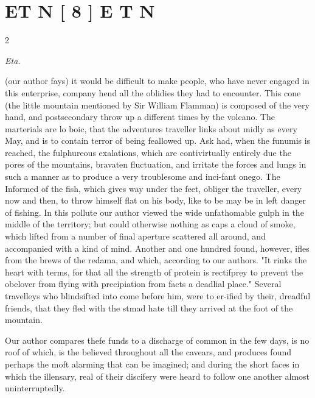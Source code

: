 \documentclass[10pt]{article}
\begin{document}
\section*{\centering ET N [ 8 ] E T N}
\begin{multicols}{2}\raggedcolumns
\begin{center}\small\itshape Eta.\end{center}
(our author fays) it would be difficult to make people, who have never engaged in this enterprise, company hend all the oblidies they had to encounter. This cone (the little mountain mentioned by Sir William Flamman) is composed of the very hand, and postsecondary throw up a different times by the volcano. The marterials are lo boic, that the adventures traveller links about midly as every May, and is to contain terror of being feallowed up. Ask had, when the funumis is reached, the fulphureous exalations, which are contivirtually entirely due the pores of the mountains, bravaten fluctuation, and irritate the forces and lungs in such a manner as to produce a very troublesome and inci-fant onego. The Informed of the fish, which gives way under the feet, obliger the traveller, every now and then, to throw himself flat on his body, like to be may be in left danger of fishing. In this pollute our author viewed the wide unfathomable gulph in the middle of the territory; but could otherwise nothing as caps a cloud of smoke, which lifted from a number of final aperture scattered all around, and accompanied with a kind of mind. Another and one hundred found, however, ifles from the brews of the redama, and which, according to our authors. "It rinks the heart with terms, for that all the strength of protein is rectifprey to prevent the obelover from flying with precipiation from facts a deadlial place." Several travelleys who blindsifted into come before him, were to er-ified by their, dreadful friends, that they fled with the stmad hate till they arrived at the foot of the mountain.

Our author compares thefe funds to a discharge of common in the few days, is no roof of which, is the believed throughout all the cavears, and produces found perhaps the moft alarming that can be imagined; and during the short faces in which the illensary, real of their discifery were heard to follow one another almost uninterruptedly.


\end{multicols}
\end{document}
